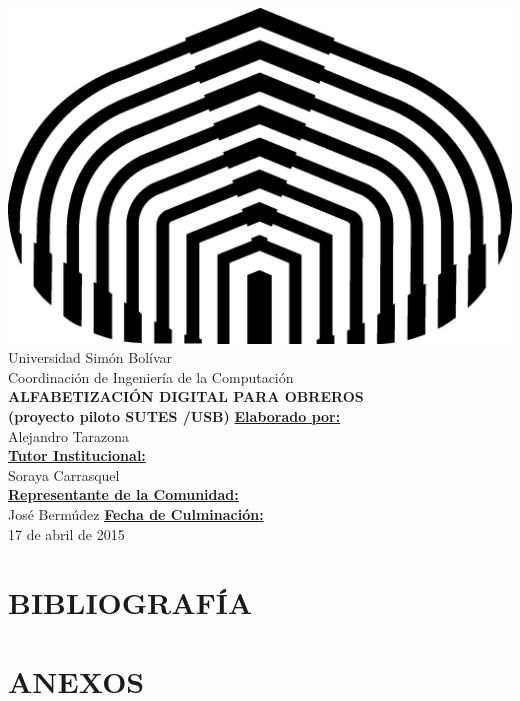 \documentclass[letterpaper,12pt]{article}
\begin{document}
	
	\begin{center}
		\includegraphics[scale=0.5]{./img/logo.png} \\
		Universidad Simón Bolívar \\
		Coordinación de Ingeniería de la Computación \\ 
		\vfill
		{\LARGE \textbf{ALFABETIZACIÓN DIGITAL PARA OBREROS \\ (proyecto piloto SUTES /USB)} }
		\vfill
		\underline{\textbf{Elaborado por:}}\\
		Alejandro Tarazona \\
		\underline{\textbf{Tutor Institucional:}}\\
		Soraya Carrasquel \\
		\underline{\textbf{Representante de la Comunidad:}}\\
		José Bermúdez
        \vfill
		\underline{\textbf{Fecha de Culminación:}}\\
        17 de abril de 2015
        \vfill
		
	\end{center}
	\pagebreak
    
    \tableofcontents
    
	\pagebreak
	
    
    
	
    
	
    

    
	
	
	
	
	
    
    
	\section{BIBLIOGRAFÍA}
    
	\pagebreak
	
	\section{ANEXOS}
\end{document}
